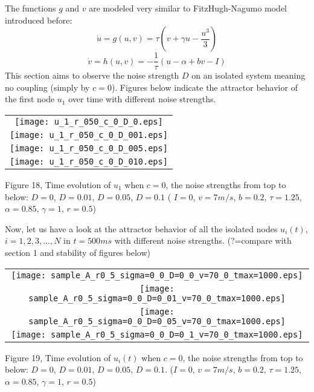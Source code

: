 \documentclass{article}
\begin{document}
The functions $g$ and $v$ are modeled very similar to FitzHugh-Nagumo model introduced before:
\begin{equation}
 \dot{u}=g(u,v)=\tau(v+\gamma u - \frac{u^3}{3})
\end{equation}
\begin{equation}
 \dot{v}=h(u,v)=-\frac{1}{\tau}(u- \alpha +bv-I)
\end{equation}
This section aims to observe the noise strength $D$ on an isolated system meaning no coupling (simply by $c=0$). Figures below indicate the attractor behavior of the first node $u_1$ over time with different noise strengths. 

\begin{center}
  \begin{tabular}{@{} c@{} }
    \texttt{[image: u\_1\_r\_050\_c\_0\_D\_0.eps]} \\
    \texttt{[image: u\_1\_r\_050\_c\_0\_D\_001.eps]} \\
    \texttt{[image: u\_1\_r\_050\_c\_0\_D\_005.eps]} \\
    \texttt{[image: u\_1\_r\_050\_c\_0\_D\_010.eps]} \\
  \end{tabular}
	\newline

\begin{footnotesize}
 Figure 18, Time evolution of $u_1$ when $c=0$, the noise strengths from top to below: $D=0$, $D=0.01$, $D=0.05$, $D=0.1$ ( $I=0$, $v=7m/s$, $b=0.2$, $\tau=1.25$, $\alpha=0.85$, $\gamma=1$, $r=0.5$)
\end{footnotesize}
\end{center}


Now, let us have a look at the attractor behavior of all the isolated nodes $u_i(t)$, $i=1,2,3,...,N$ in $t=500ms$ with different noise strengths. (?=compare with section 1 and stability of figures below) 

\begin{center}
  \begin{tabular}{@{} c@{} }
    \texttt{[image: sample\_A\_r0\_5\_sigma=0\_0\_D=0\_0\_v=70\_0\_tmax=1000.eps]} \\
    \texttt{[image: sample\_A\_r0\_5\_sigma=0\_0\_D=0\_01\_v=70\_0\_tmax=1000.eps]} \\
    \texttt{[image: sample\_A\_r0\_5\_sigma=0\_0\_D=0\_05\_v=70\_0\_tmax=1000.eps]} \\
    \texttt{[image: sample\_A\_r0\_5\_sigma=0\_0\_D=0\_1\_v=70\_0\_tmax=1000.eps]} \\
  \end{tabular}
	\newline

\begin{footnotesize}
 Figure 19, Time evolution of $u_i(t)$ when $c=0$, the noise strengths from top to below: $D=0$, $D=0.01$, $D=0.05$, $D=0.1$. ($I=0$, $v=7m/s$, $b=0.2$, $\tau=1.25$, $\alpha=0.85$, $\gamma=1$, $r=0.5$)
\end{footnotesize}
\end{center}
\end{document}
